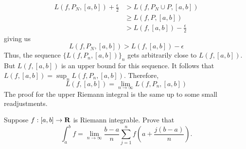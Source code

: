 \begin{solution}
\begin{align*}
        L(f, P_N, [a,b]) + \frac{\epsilon}{2} &> L(f, P_N\cup P, [a,b]) \\
        &\geq L(f, P, [a,b]) \\
        &> L(f, [a,b]) - \frac{\epsilon}{2}
    \end{align*}
    giving us
    $$L(f, P_N, [a,b]) > L(f, [a,b]) - \epsilon$$
    Thus, the sequence $\{L(f, P_n, [a,b])\}_n$ gets arbitrarily close to $L(f, [a,b])$. But $L(f, [a,b])$ is an upper bound for this sequence. It follows that $L(f, [a,b]) = \sup_n L(f, P_n, [a,b])$. Therefore, 
    $$L(f, [a,b]) = \lim_{n \rightarrow \infty}L(f, P_n, [a,b])$$
    The proof for the upper Riemann integral is the same up to some small readjustments. \\
\end{solution}

\begin{exercise}
    Suppose $f:[a,b] \to \mathbf{R}$ is Riemann integrable. Prove that
    $$\int_{a}^{b}f = \lim_{n \rightarrow \infty}\frac{b-a}{n}\sum_{j=1}^{n}f\left(a+\frac{j(b-a)}{n}\right).$$
\end{exercise}

